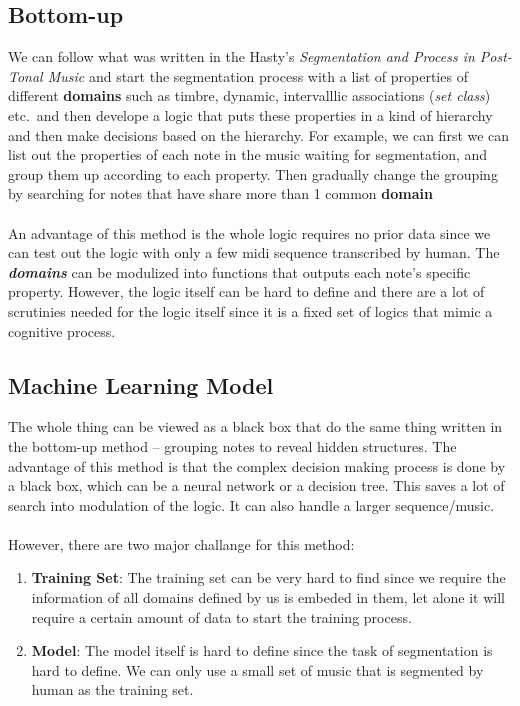 \documentclass[12pt]{report}
\begin{document}
\subsection*{Bottom-up}
We can follow what was written in the Hasty's \textit{Segmentation and Process in Post-Tonal Music}
and start the segmentation process with a list of properties 
of different \textbf{domains} such as timbre, dynamic, intervalllic associations (\emph{set class})
etc.\ and then develope a logic that puts these properties in a kind of hierarchy
and then make decisions based on the hierarchy. For example, we can first 
we can list out the properties of each note in the music waiting
for segmentation, and group them up according to each property.
Then gradually change the grouping by searching for notes that
have share more than 1 common \textbf{domain}\\\\
An advantage of this method is the whole logic requires no 
prior data since we can test out the logic with only a few 
midi sequence transcribed by human. The \textit{\textbf{domains}}
can be modulized into functions that outputs each note's specific
property.
However, the logic itself can be hard to define and there are
a lot of scrutinies needed for the logic itself since it is a fixed
set of logics that mimic a cognitive process.

\subsection*{Machine Learning Model}
The whole thing can be viewed as a black box that do the same 
thing written in the bottom-up method -- grouping notes to 
reveal hidden structures. The advantage of this method is that 
the complex decision making process is done by a black box, which 
can be a neural network or a decision tree. This saves a lot of 
search into modulation of the logic. It can also handle a larger 
sequence/music.\\\\
However, there are two major challange for this method:
\begin{enumerate}
    \item \textbf{Training Set}: The training set can be very hard to find since
    we require the information of all domains defined by us is 
    embeded in them, let alone it will require a certain amount of
    data to start the training process.
    \item \textbf{Model}: The model itself is hard to define since the 
    task of segmentation is hard to define. We can only use a 
    small set of music that is segmented by human as the training set.
\end{enumerate}
\end{document}
